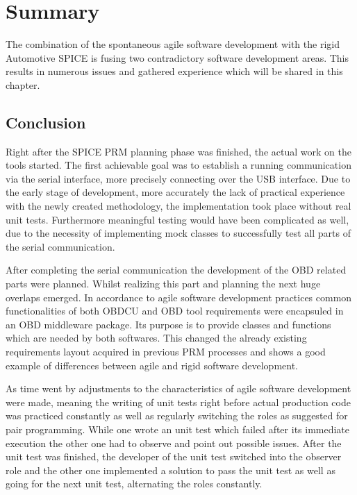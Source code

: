 

\chapter{Summary}
\label{sec:summary}
The combination of the spontaneous agile software development with the rigid Automotive SPICE is fusing two contradictory software development areas. 
This results in numerous issues and gathered experience which will be shared in this chapter.

\section{Conclusion}
\label{sec:conclusion}

Right after the SPICE PRM planning phase was finished, the actual work on the tools started. The first achievable goal was to establish a 
running communication via the serial interface, more precisely connecting over the USB interface. Due to the early stage of development, more 
accurately the lack of practical experience with the newly created methodology, the implementation took place without real unit tests. 
Furthermore meaningful testing would have been complicated as well, due to the necessity of implementing mock classes to successfully test 
all parts of the serial communication.

After completing the serial communication the development of the OBD related parts were planned. Whilst realizing this part and planning the next 
huge overlaps emerged. In accordance to agile software development practices common functionalities of both OBDCU and OBD tool requirements were 
encapsuled in an OBD middleware package. Its purpose is to provide classes and functions which are needed by both softwares. 
This changed the already existing requirements layout acquired in previous PRM processes and shows a good example of differences 
between agile and rigid software development.

As time went by adjustments to the characteristics of agile software development were made, meaning the writing of unit tests right before actual 
production code was practiced constantly as well as regularly switching the roles as suggested for pair programming. While one wrote an unit 
test which failed after its immediate execution the other one had to observe and point out possible issues. After the unit test was finished, 
the developer of the unit test switched into the observer role and the other one implemented a solution to pass the unit test as well as going 
for the next unit test, alternating the roles constantly.

